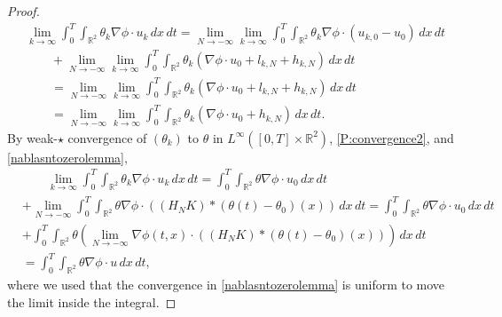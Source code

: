\documentclass[11pt,reqno,xcolor=svgnames]{amsart}
\def\R{{\mathbb R}}
\theoremstyle{plain}
\theoremstyle{definition}
\theoremstyle{plain}
\theoremstyle{remark}
\begin{document}
\begin{proof}
\begin{equation*}
\begin{split}
& \lim_{k\rightarrow\infty} \int_0^T\int_{\R^2}\theta_k \nabla\phi \cdot u_k \, dx \, dt=  \lim_{N\rightarrow-\infty}\lim_{k\rightarrow\infty}\int_0^T\int_{\R^2} \theta_k \nabla \phi \cdot (u_{k,0} -u_{0}) \, dx \, dt\\
&\qquad  +   \lim_{N\rightarrow-\infty}\lim_{k\rightarrow\infty}\int_0^T\int_{\R^2} \theta_k (\nabla \phi \cdot u_{0} + l_{k,N} + h_{k,N}) \, dx \, dt \\
& \qquad =  \lim_{N\rightarrow-\infty}\lim_{k\rightarrow\infty}\int_0^T\int_{\R^2} \theta_k (\nabla \phi \cdot u_{0} + l_{k,N} + h_{k,N})\, dx \, dt\\
&\qquad =\lim_{N\rightarrow-\infty}\lim_{k\rightarrow\infty} \int_0^T\int_{\R^2}\theta_k (\nabla \phi \cdot u_{0}  + h_{k,N}) \, dx \, dt.
\end{split}
\end{equation*} 
By weak-$\star$ convergence of $(\theta_k)$ to $\theta$ in $L^{\infty}([0,T]\times \R^2)$, \cref{P:convergence2}, and \cref{nablasntozerolemma}, 
\begin{equation*}
\begin{split}
&\qquad \lim_{k\rightarrow\infty} \int_0^T\int_{\R^2} \theta_k \nabla\phi \cdot u_k \, dx \, dt = \int_0^T\int_{\R^2} \theta \nabla\phi \cdot u_0 \, dx\, dt \\
&+\lim_{N\rightarrow -\infty} \int_0^T\int_{\R^2} \theta \nabla\phi \cdot \left( (H_NK)\ast (\theta(t) - \theta_0)(x) \right) \, dx\, dt  = \int_0^T\int_{\R^2} \theta \nabla\phi \cdot u_0 \, dx\, dt  \\
& +\int_0^T\int_{\R^2} \theta  \left(\lim_{N\rightarrow -\infty} \nabla\phi(t,x) \cdot ((H_NK)\ast (\theta(t) - \theta_0)(x)) \right) \, dx \, dt\\
&  = \int_0^T\int_{\R^2} \theta \nabla\phi \cdot u \, dx \, dt, 
\end{split}
\end{equation*}
where we used that the convergence in \cref{nablasntozerolemma} is uniform to move the limit inside the integral. 
\end{proof}
\end{document}
